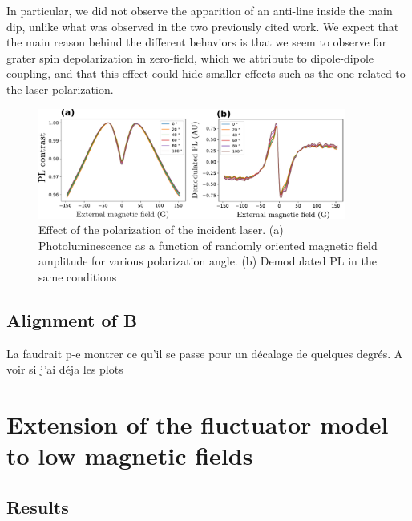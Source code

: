 \documentclass[preprintnumbers,amsmath,amssymb,onecolumn,12pt]{revtex4-2}\usepackage{graphicx}%
\begin{document}
In particular, we did not observe the apparition of an anti-line inside the main dip, unlike what was observed in the two previously cited work. We expect that the main reason behind the different behaviors is that we seem to observe far grater spin depolarization in zero-field, which we attribute to dipole-dipole coupling, and that this effect could hide smaller effects such as the one related to the laser polarization.
\begin{figure}
\includegraphics[width=0.9\textwidth]{Figures_SI/fig_Pola}
\caption{Effect of the polarization of the incident laser. (a) Photoluminescence as a function of randomly oriented magnetic field amplitude for various polarization angle. (b) Demodulated PL in the same conditions}
\label{Pola}
\end{figure}
\subsection{Alignment of B}
La faudrait p-e montrer ce qu'il se passe pour un décalage de quelques degrés. A voir si j'ai déja les plots
\section{Extension of the fluctuator model to low magnetic fields}

\subsection{Results}
\end{document}
